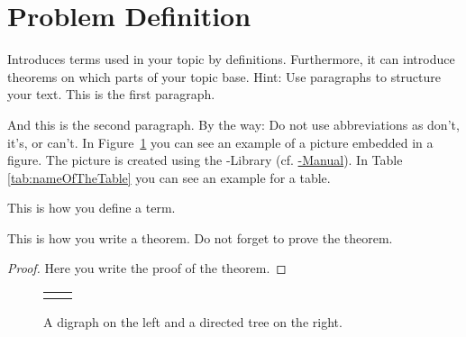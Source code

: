 \section{Problem Definition}
\label{sec:problem_definition}
Introduces terms used in your topic by definitions. Furthermore, it 
can introduce theorems on which parts of your topic base. Hint: Use 
paragraphs to structure your text. This is the first paragraph.

And this is the second paragraph. By the way: Do not use 
abbreviations as don't, it's, or can't. In Figure~\ref{fig:graph} 
you can see an example of a picture embedded in a figure. The
picture is created using the \TikZ-Library (cf. 
\href{../manuals/tikzpgfmanual.pdf}{\TikZ-Manual}). In Table
\ref{tab:nameOfTheTable} you can see an example for a table.

\begin{definition}
\label{def:nameOfTerm}
This is how you define a term.
\end{definition}

\begin{theorem}
\label{the:nameOfTheorem}
This is how you write a theorem. Do not forget to prove the theorem.
\begin{proof}
	Here you write the proof of the theorem.
\end{proof}
\end{theorem}

\begin{figure}[htb] %
	\begin{center}
		\begin{tabular}{cc}
			\begin{minipage}{0.35\linewidth} %
				\begin{center}
					
				\end{center}
			\end{minipage}
			&
			\begin{minipage}{0.55\linewidth} %
				\begin{center}
					
				\end{center}
			\end{minipage}
		\end{tabular}
	\end{center}
	\caption{A digraph on the left and a directed tree on the right.}
	\label{fig:graph}
\end{figure}

